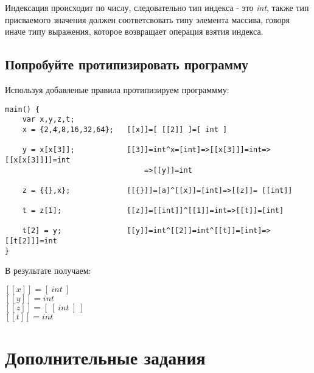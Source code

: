 \documentclass{report}
\begin{document}
Индексация происходит по числу, следовательно тип индекса - это \textit{int}, также тип присваемого значения должен соответсвовать типу элемента массива, говоря иначе типу выражения, которое возвращает операция взятия индекса.

\newpage
\subsection{Попробуйте протипизировать программу}

Используя добавленые правила протипизируем программму:

\begingroup
\begin{center}
\begin{lstlisting}
main() {
    var x,y,z,t;
    x = {2,4,8,16,32,64};   [[x]]=[ [[2]] ]=[ int ]

    y = x[x[3]];            [[3]]=int^x=[int]=>[[x[3]]]=int=>[[x[x[3]]]]=int
                                =>[[y]]=int

    z = {{},x};             [[{}]]=[a]^[[x]]=[int]=>[[z]]= [[int]]

    t = z[1];               [[z]]=[[int]]^[[1]]=int=>[[t]]=[int]

    t[2] = y;               [[y]]=int^[[2]]=int^[[t]]=[int]=>[[t[2]]]=int
}
\end{lstlisting}
\end{center}
\endgroup

В результате получаем:

\begin{center}
    \( [[x]] = [\ int\ ] \) \\
    \(  [[y]] = int \) \\
    \(  [[z]] = [\ [\ int\ ]\ ] \) \\
    \(  [[t]] = int \) \\
\end{center}

\section{Дополнительные задания}
\end{document}
